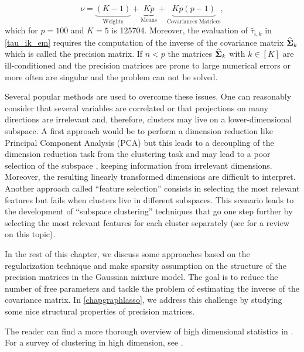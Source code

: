 \begin{equation}
   \nu = \underbrace{(K-1)}_\text{Weights}+ \underbrace{Kp}_\text{Means} + \underbrace{Kp(p-1)}_\text{Covariances Matrices},
 \end{equation}
which for $p=100$ and $K=5$ is 125704. Moreover, the evaluation of $\hat\tau_{i,k}$ in \cref{tau_ik_em} requires the computation of the inverse of the covariance matrix $\widehat{\boldsymbol\Sigma}_k$ which is called the precision matrix. If $n<p$ the matrices $\widehat{\boldsymbol\Sigma}_k$ with $ k\in[K]$ are ill-conditioned and the precision matrices are prone to large numerical errors or more often are singular and the problem can not be solved.

Several popular methods are used to overcome these issues. One can reasonably consider that several variables are correlated or that projections on many directions are irrelevant and, therefore, clusters may live on a lower-dimensional subspace. A first approach would be to perform a dimension reduction like Principal Component Analysis (PCA) but this leads to a decoupling of the dimension reduction task from the clustering task and may lead to a poor selection of the subspace \citep{bouveyron:hal-00750909}, keeping information from irrelevant dimensions. Moreover, the resulting linearly transformed dimensions are difficult to interpret. Another approach called ``feature selection'' consists in selecting the most relevant features but fails when clusters live in different subspaces. This scenario leads to the development of ``subspace clustering'' techniques that go one step further by selecting the most relevant features for each cluster separately (see \citep{Parsons:2004:SCH:1007730.1007731} for a review on this topic). 

In the rest of this chapter, we discuss some approaches based on the regularization technique and make sparsity assumption on the structure of the precision matrices in the Gaussian mixture model. The goal is to reduce the number of free parameters and tackle the problem of estimating the inverse of the covariance matrix. In \cref{chapgraphlasso}, we address this challenge by studying some nice structural properties of precision matrices.

The reader can find a more thorough overview of high dimensional statistics in \cite{giraud2014introduction,Zimek2012,buhlmann2011statistics}. For a survey of clustering in high dimension, see \citep{bouveyron:hal-00750909,Parsons:2004:SCH:1007730.1007731}.